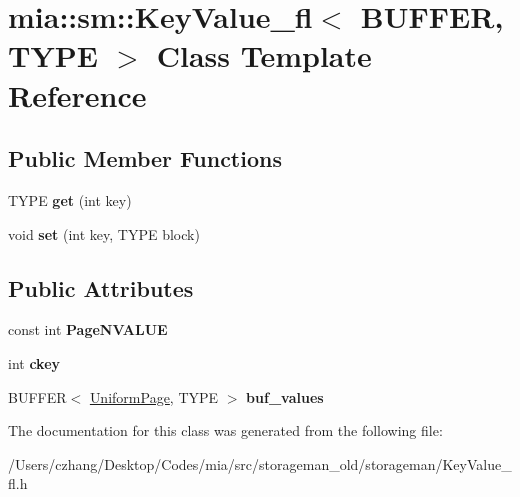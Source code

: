 \hypertarget{classmia_1_1sm_1_1_key_value__fl}{\section{mia\-:\-:sm\-:\-:Key\-Value\-\_\-fl$<$ B\-U\-F\-F\-E\-R, T\-Y\-P\-E $>$ Class Template Reference}
\label{classmia_1_1sm_1_1_key_value__fl}
}
\subsection*{Public Member Functions}
\begin{DoxyCompactItemize}
\item 
\hypertarget{classmia_1_1sm_1_1_key_value__fl_a80ee244393b3e2fbed2c5ae5070963c4}{T\-Y\-P\-E {\bfseries get} (int key)}\label{classmia_1_1sm_1_1_key_value__fl_a80ee244393b3e2fbed2c5ae5070963c4}

\item 
\hypertarget{classmia_1_1sm_1_1_key_value__fl_a7088d4e1595a09f06e8f9046d84e8e18}{void {\bfseries set} (int key, T\-Y\-P\-E block)}\label{classmia_1_1sm_1_1_key_value__fl_a7088d4e1595a09f06e8f9046d84e8e18}

\end{DoxyCompactItemize}
\subsection*{Public Attributes}
\begin{DoxyCompactItemize}
\item 
\hypertarget{classmia_1_1sm_1_1_key_value__fl_a6259565d4319cf459c8d9df78c385b23}{const int {\bfseries Page\-N\-V\-A\-L\-U\-E}}\label{classmia_1_1sm_1_1_key_value__fl_a6259565d4319cf459c8d9df78c385b23}

\item 
\hypertarget{classmia_1_1sm_1_1_key_value__fl_a8238fc95f7391378a60fd8b2f3cf1f4b}{int {\bfseries ckey}}\label{classmia_1_1sm_1_1_key_value__fl_a8238fc95f7391378a60fd8b2f3cf1f4b}

\item 
\hypertarget{classmia_1_1sm_1_1_key_value__fl_adc95a4da9b2a68621d8a7858031091e5}{B\-U\-F\-F\-E\-R$<$ \hyperlink{classmia_1_1sm_1_1_uniform_page}{Uniform\-Page}, T\-Y\-P\-E $>$ {\bfseries buf\-\_\-values}}\label{classmia_1_1sm_1_1_key_value__fl_adc95a4da9b2a68621d8a7858031091e5}

\end{DoxyCompactItemize}


The documentation for this class was generated from the following file\-:\begin{DoxyCompactItemize}
\item 
/\-Users/czhang/\-Desktop/\-Codes/mia/src/storageman\-\_\-old/storageman/Key\-Value\-\_\-fl.\-h\end{DoxyCompactItemize}
